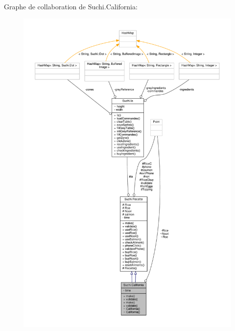 Graphe de collaboration de Suchi.\+California\+:\nopagebreak
\begin{figure}[H]
\begin{center}
\leavevmode
\includegraphics[width=350pt]{classSuchi_1_1California__coll__graph}
\end{center}
\end{figure}
